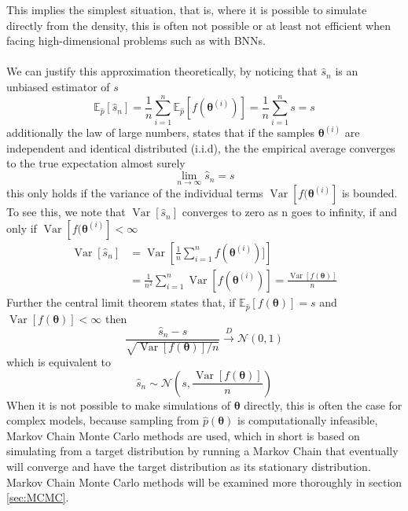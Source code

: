 This implies the simplest situation, that is, where it is possible to simulate directly from the density, this is often not possible or at least not efficient when facing high-dimensional problems such as with BNNs.\\
\\
We can justify this approximation theoretically, by noticing that $\hat{s}_n$ is an unbiased estimator of $s$
\begin{equation*}
    \mathbb{E}_{\hat{p}}\left[\hat{s}_{n}\right]=\frac{1}{n} \sum_{i=1}^{n} \mathbb{E}_{\hat{p}}\left[f\left(\boldsymbol{\theta}^{(i)}\right)\right]=\frac{1}{n} \sum_{i=1}^{n} s=s
\end{equation*}
additionally the law of large numbers, states that if the samples $\boldsymbol{\theta}^{(i)}$ are independent and identical distributed (i.i.d), the the empirical average converges to the true expectation almost surely
\begin{equation*}
    \lim _{n \rightarrow \infty} \hat{s}_{n}=s
\end{equation*}
this only holds if the variance of the individual terms $\operatorname{Var}[f(\boldsymbol{\theta}^{(i)}]$ is bounded. To see this, we note that $\operatorname{Var}[\hat{s}_n]$ converges to zero as n goes to infinity, if and only if $\operatorname{Var}[f(\boldsymbol{\theta}^{(i)}]<\infty$
\begin{equation*}
    \begin{split}
\operatorname{Var}\left[\hat{s}_{n}\right] &=\operatorname{Var}\left[\frac{1}{n} \sum_{i=1}^{n} f(\boldsymbol{\theta}^{(i)})]\right] \\ &=\frac{1}{n^{2}} \sum_{i=1}^{n} \operatorname{Var}[f(\boldsymbol{\theta}^{(i)})]
=\frac{\operatorname{Var}[f(\boldsymbol{\theta})]}{n}
\end{split}
\end{equation*}
Further the central limit theorem states that, if $\mathbb{E}_{\hat{p}}[f(\boldsymbol{\theta})]=s$ and $\operatorname{Var}[f(\boldsymbol{\theta})]<\infty$ then
\begin{equation*}
    \frac{\hat{s}_{n}-s}{\sqrt{\operatorname{Var}[f(\boldsymbol{\theta})] / n}} \stackrel{D}{\rightarrow} \mathcal{N}(0,1)
\end{equation*}
which is equivalent to
\begin{equation*}
    \hat{s}_n\sim \mathcal{N}\left(s,\frac{\operatorname{Var}[f(\boldsymbol{\theta})]}{n}\right)
\end{equation*}
When it is not possible to make simulations of $\boldsymbol{\theta}$ directly, this is often the case for complex models, because sampling from $\hat{p}(\boldsymbol{\theta})$ is computationally infeasible, Markov Chain Monte Carlo methods are used, which in short is based on simulating from a target distribution by running a Markov Chain that eventually will converge and have the target distribution as its stationary distribution. Markov Chain Monte Carlo methods will be examined more thoroughly in section \ref{sec:MCMC}.



